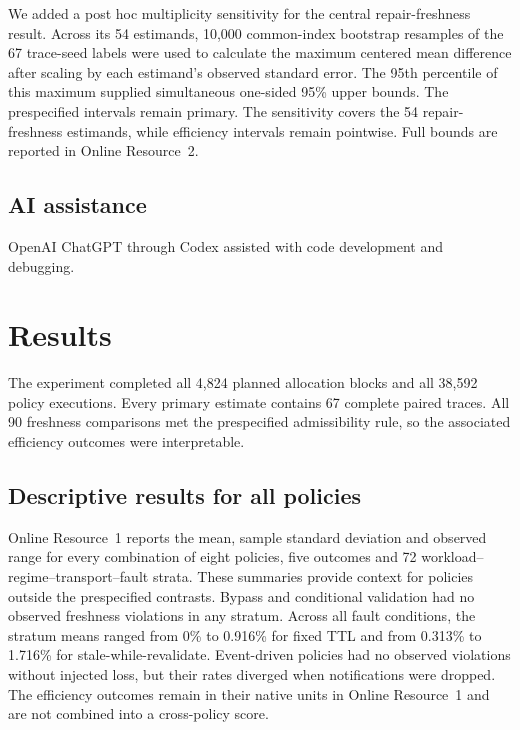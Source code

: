 \documentclass[pdflatex,sn-mathphys-num]{sn-jnl}
\begin{document}
We added a post hoc multiplicity sensitivity for the central repair-freshness result. Across its 54 estimands, 10,000 common-index bootstrap resamples of the 67 trace-seed labels were used to calculate the maximum centered mean difference after scaling by each estimand's observed standard error. The 95th percentile of this maximum supplied simultaneous one-sided 95\% upper bounds. The prespecified intervals remain primary. The sensitivity covers the 54 repair-freshness estimands, while efficiency intervals remain pointwise. Full bounds are reported in Online Resource~2.

\subsection{AI assistance}\label{ai-assistance}

OpenAI ChatGPT through Codex assisted with code development and debugging.

\section{Results}\label{results}

The experiment completed all 4,824 planned allocation blocks and all 38,592 policy executions. Every primary estimate contains 67 complete paired traces. All 90 freshness comparisons met the prespecified admissibility rule, so the associated efficiency outcomes were interpretable.

\subsection{Descriptive results for all policies}\label{descriptive-results-for-all-policies}

Online Resource~1 reports the mean, sample standard deviation and observed range for every combination of eight policies, five outcomes and 72 workload--regime--transport--fault strata. These summaries provide context for policies outside the prespecified contrasts. Bypass and conditional validation had no observed freshness violations in any stratum. Across all fault conditions, the stratum means ranged from 0\% to 0.916\% for fixed TTL and from 0.313\% to 1.716\% for stale-while-revalidate. Event-driven policies had no observed violations without injected loss, but their rates diverged when notifications were dropped. The efficiency outcomes remain in their native units in Online Resource~1 and are not combined into a cross-policy score.
\end{document}

